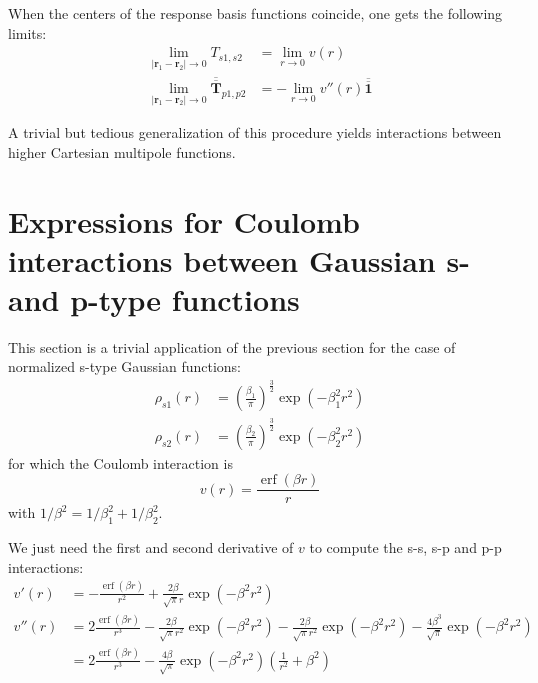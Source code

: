 \documentclass[a4paper,12pt,parskip=half]{scrartcl}
\newcommand*{\tensor}[1]{\overline{\overline{\mathbold{#1}}}}
\DeclareMathOperator{\erf}{erf}
\begin{document}
When the centers of the response basis functions coincide, one gets the following limits:
%
\begin{align}
    \lim_{|\mathbold{r}_1 - \mathbold{r}_2| \rightarrow 0} T_{s1,s2} &= \lim_{r\rightarrow 0} v(r) \\
    \lim_{|\mathbold{r}_1 - \mathbold{r}_2| \rightarrow 0} \tensor{T}_{p1,p2} &= -\lim_{r\rightarrow 0} v''(r) \tensor{1}
\end{align}

A trivial but tedious generalization of this procedure yields interactions between higher Cartesian multipole functions.


\section{Expressions for Coulomb interactions between Gaussian s- and p-type functions}

This section is a trivial application of the previous section for the case of normalized s-type Gaussian functions:
%
\begin{align}
    \rho_{s1}(r) &= \left(\frac{\beta_1}{\pi}\right)^{\frac{3}{2}} \exp(-\beta_1^2 r^2) \\
    \rho_{s2}(r) &= \left(\frac{\beta_2}{\pi}\right)^{\frac{3}{2}} \exp(-\beta_2^2 r^2)
\end{align}
%
for which the Coulomb interaction is
%
\begin{equation}
    \label{eq:ss_gauss}
    v(r) = \frac{\erf(\beta r)}{r}
\end{equation}
%
with $1/\beta^2 = 1/\beta_1^2 + 1/\beta_2^2$.

We just need the first and second derivative of $v$ to compute the s-s, s-p and p-p interactions:
%
\begin{align}
    v'(r) &= -\frac{\erf(\beta r)}{r^2} + \frac{2 \beta}{\sqrt{\pi} r} \exp(-\beta^2 r^2) \\
    \label{eq:pp_gauss}
    v''(r) &= 2\frac{\erf(\beta r)}{r^3} - \frac{2 \beta}{\sqrt{\pi} r^2} \exp(-\beta^2 r^2)
     -\frac{2 \beta}{\sqrt{\pi} r^2} \exp(-\beta^2 r^2) - \frac{4 \beta^3}{\sqrt{\pi}} \exp(-\beta^2 r^2)\\
           &= 2\frac{\erf(\beta r)}{r^3} - \frac{4 \beta}{\sqrt{\pi}} \exp(-\beta^2 r^2)
              \left( \frac{1}{r^2} + \beta^2 \right)
\end{align}
\end{document}
